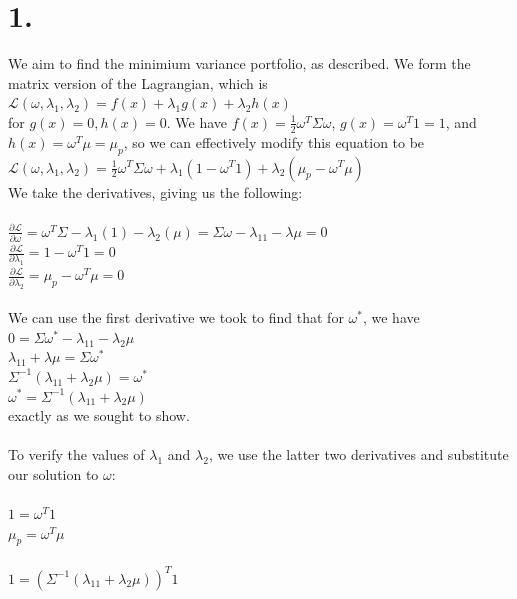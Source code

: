 \documentclass{article}
\begin{document}
\thispagestyle{firstpageheader}

\section*{1.}
{\Large 

We aim to find the minimium variance portfolio, as described. We form the matrix version of the Lagrangian, which is \\
$\mathcal{L} (\omega, \lambda_1, \lambda_2) = f(x) + \lambda_1 g(x) + \lambda_2 h(x)$ \\
for $g(x) = 0, h(x) = 0$. We have $f(x) = \frac{1}{2}\omega^T \Sigma \omega$, $g(x) = \omega^T 1 = 1$, and $h(x) = \omega^T \mu = \mu_p$, so we can effectively modify this equation to be \\
$\mathcal{L} (\omega, \lambda_1, \lambda_2) = \frac{1}{2}\omega^T \Sigma \omega + \lambda_1 (1 - \omega^T 1) + \lambda_2 (\mu_p - \omega^T \mu)$ \\
We take the derivatives, giving us the following: \\ \\
$\frac{\partial \mathcal{L}}{\partial \omega} = \omega^T\Sigma - \lambda_1(1) - \lambda_2(\mu) = \Sigma\omega - \lambda_11 - \lambda\mu = 0$ \\ 
$\frac{\partial \mathcal{L}}{\partial \lambda_1} = 1 - \omega^T1 = 0$ \\
$\frac{\partial \mathcal{L}}{\partial \lambda_2} = \mu_p - \omega^T\mu = 0$ \\ \\
We can use the first derivative we took to find that for $\omega^*$, we have \\
$0 = \Sigma\omega^* - \lambda_11 - \lambda_2\mu$ \\
$\lambda_11 + \lambda\mu = \Sigma\omega^*$ \\
$\Sigma^{-1}(\lambda_11 + \lambda_2\mu) = \omega^*$ \\
$\omega^* = \Sigma^{-1}(\lambda_11 + \lambda_2\mu)$ \\
exactly as we sought to show. \\ \\
To verify the values of $\lambda_1$ and $\lambda_2$, we use the latter two derivatives and substitute our solution to $\omega$: \\ \\
$1 = \omega^T1$ \\
$\mu_p = \omega^T\mu$ \\ \\
$1 = (\Sigma^{-1}(\lambda_11 + \lambda_2\mu))^T1$ \\
}
\end{document}
